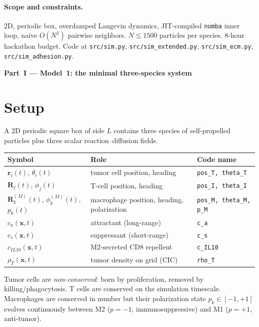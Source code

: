 \documentclass[11pt,letterpaper]{article}
\begin{document}
\paragraph{Scope and constraints.}
2D, periodic box, overdamped Langevin dynamics, JIT-compiled
\texttt{numba} inner loop, naive $O(N^2)$ pairwise neighbors.
$N \lesssim 1500$ particles per species. 8-hour hackathon budget. Code
at \texttt{src/sim.py}, \texttt{src/sim\_extended.py},
\texttt{src/sim\_ecm.py}, \texttt{src/sim\_adhesion.py}.

\begin{center}
{\bfseries Part~I --- Model~1: the minimal three-species system}
\end{center}

\section{Setup}
\label{sec:m1-setup}

A 2D periodic square box of side $L$ contains three species of
self-propelled particles plus three scalar reaction--diffusion fields.

\begin{tabular}{lll}
\toprule
Symbol & Role & Code name \\
\midrule
$\mathbf{r}_i(t)$, $\theta_i(t)$ & tumor cell position, heading & \texttt{pos\_T, theta\_T}\\
$\mathbf{R}_j(t)$, $\phi_j(t)$    & T-cell position, heading      & \texttt{pos\_I, theta\_I}\\
$\mathbf{R}_k^{(M)}(t)$, $\phi_k^{(M)}(t)$, $p_k(t)$ & macrophage position, heading, polarization & \texttt{pos\_M, theta\_M, p\_M}\\
$c_a(\mathbf{x},t)$                & attractant (long-range)       & \texttt{c\_a}\\
$c_s(\mathbf{x},t)$                & suppressant (short-range)     & \texttt{c\_s}\\
$c_{IL10}(\mathbf{x},t)$           & M2-secreted CD8 repellent     & \texttt{c\_IL10}\\
$\rho_T(\mathbf{x},t)$             & tumor density on grid (CIC)   & \texttt{rho\_T}\\
\bottomrule
\end{tabular}

\medskip

Tumor cells are \emph{non-conserved}: born by proliferation, removed by
killing/phagocytosis. T cells are conserved on the simulation
timescale. Macrophages are conserved in number but their polarization
state $p_k \in [-1,+1]$ evolves continuously between M2 ($p=-1$,
immunosuppressive) and M1 ($p=+1$, anti-tumor).
\end{document}
